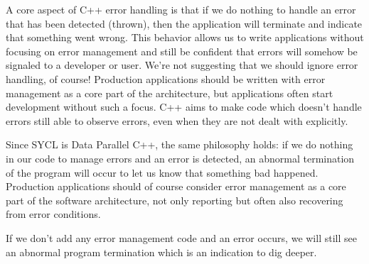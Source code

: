 A core aspect of C++ error handling is that if we do nothing to handle an error that has been detected (thrown), then the application will terminate and indicate that something went wrong. This behavior allows us to write applications without focusing on error management and still be confident that errors will somehow be signaled to a developer or user. We’re not suggesting that we should ignore error handling, of course! Production applications should be written with error management as a core part of the architecture, but applications often start development without such a focus. C++ aims to make code which doesn’t handle errors still able to observe errors, even when they are not dealt with explicitly.\par

Since SYCL is Data Parallel C++, the same philosophy holds: if we do nothing in our code to manage errors and an error is detected, an abnormal termination of the program will occur to let us know that something bad happened. Production applications should of course consider error management as a core part of the software architecture, not only reporting but often also recovering from error conditions.\par

\begin{tcolorbox}[colback=red!5!white,colframe=red!75!black]
If we don’t add any error management code and an error occurs, we will still see an abnormal program termination which is an indication to dig deeper.
\end{tcolorbox}


























